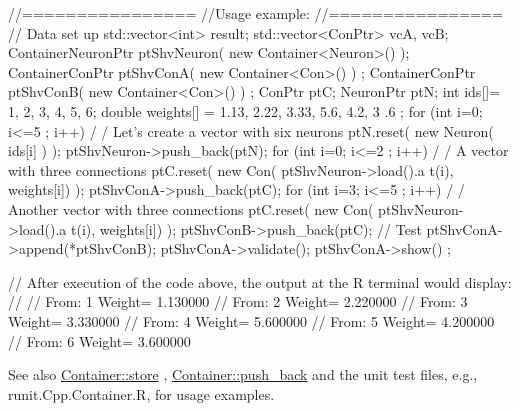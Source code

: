 \begin{DoxyCode}
        //================
        //Usage example:
        //================
        // Data set up
                                std::vector<int> result;
                                std::vector<ConPtr> vcA, vcB;
                                ContainerNeuronPtr      ptShvNeuron( new 
      Container<Neuron>() );
                                ContainerConPtr ptShvConA( new Container<Con>() )
      ;
                                ContainerConPtr ptShvConB( new Container<Con>() )
      ;
                                ConPtr  ptC;
                                NeuronPtr ptN;
                                int ids[]= {1, 2, 3, 4, 5, 6};
                                double weights[] = {1.13, 2.22, 3.33, 5.6, 4.2, 3
      .6 };
                                for (int i=0; i<=5 ; i++) {                             /
      / Let's create a vector with six neurons
                                        ptN.reset( new Neuron( ids[i] ) );
                                        ptShvNeuron->push_back(ptN);
                                }
                                for (int i=0; i<=2 ; i++) {                             /
      / A vector with three connections
                                        ptC.reset( new Con( ptShvNeuron->load().a
      t(i), weights[i]) );
                                        ptShvConA->push_back(ptC);
                                }
                                for (int i=3; i<=5 ; i++) {                             /
      / Another vector with three connections
                                        ptC.reset( new Con( ptShvNeuron->load().a
      t(i), weights[i]) );
                                        ptShvConB->push_back(ptC);
                                }
        // Test
                                ptShvConA->append(*ptShvConB);
                                ptShvConA->validate();
                                ptShvConA->show() ;

        // After execution of the code above, the output at the R terminal would 
      display:
        //
        //  From:        1       Weight=         1.130000
        //      From:    2       Weight=         2.220000
        //      From:    3       Weight=         3.330000
        //      From:    4       Weight=         5.600000
        //      From:    5       Weight=         4.200000
        //      From:    6       Weight=         3.600000
\end{DoxyCode}


\begin{DoxySeeAlso}{See also}
\hyperlink{class_container_aadc7faacbf43540e46144319f7369a3e}{Container::store} , \hyperlink{class_container_afd87c69cb799ed7b434c29090083a285}{Container::push\_\-back} and the unit test files, e.g., runit.Cpp.Container.R, for usage examples. 
\end{DoxySeeAlso}


